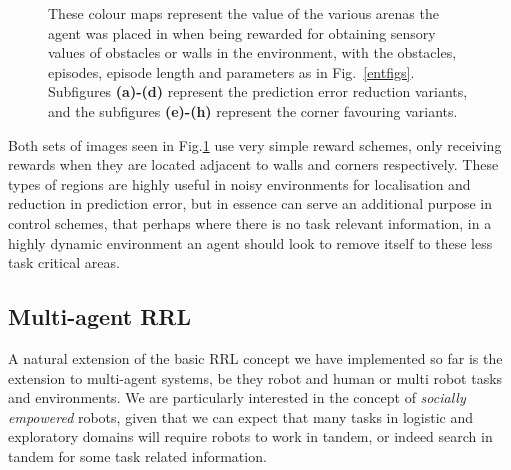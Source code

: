 \documentclass{article}
\begin{document}
\begin{figure}[ht]
\caption{These colour maps represent the value of the various arenas the agent was placed in when being rewarded for obtaining sensory values of obstacles or walls in the environment, with the obstacles, episodes, episode length and parameters as in Fig.~\ref{entfigs}. Subfigures \textbf{(a)-(d)} represent the prediction error reduction variants, and the subfigures \textbf{(e)-(h)} represent the corner favouring variants.\label{othervariants}}
\end{figure}

Both sets of images seen in Fig.\ref{othervariants} use very simple reward schemes, only receiving rewards when they are located adjacent to walls and corners respectively. These types of regions are highly useful in noisy environments for localisation and reduction in prediction error, but in essence can serve an additional purpose in control schemes, that perhaps where there is no task relevant information, in a highly dynamic environment an agent should look to remove itself to these less task critical areas.

\subsection{Multi-agent RRL}
\label{sharedspace}
A natural extension of the basic RRL concept we have implemented so far is the extension to multi-agent systems, be they robot and human or multi robot tasks and environments. We are particularly interested in the concept of \emph{socially empowered} robots, given that we can expect that many tasks in logistic and exploratory domains will require robots to work in tandem, or indeed search in tandem for some task related information.
\end{document}
